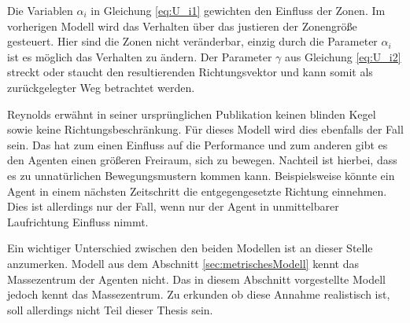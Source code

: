 Die Variablen $\alpha_i$ in Gleichung \ref{eq:U_i1} gewichten den Einfluss der Zonen. Im vorherigen Modell wird das Verhalten über das justieren der Zonengröße gesteuert. Hier sind die Zonen nicht veränderbar, einzig durch die Parameter $\alpha_i$ ist es möglich das Verhalten zu ändern. Der Parameter $\gamma$ aus Gleichung \ref{eq:U_i2} streckt oder staucht den resultierenden Richtungsvektor und kann somit als zurückgelegter Weg betrachtet werden.

Reynolds erwähnt in seiner ursprünglichen Publikation keinen blinden Kegel sowie keine Richtungsbeschränkung. Für dieses Modell wird dies ebenfalls der Fall sein. Das hat zum einen Einfluss auf die Performance und zum anderen gibt es den Agenten einen größeren Freiraum, sich zu bewegen.
Nachteil ist hierbei, dass es zu unnatürlichen Bewegungsmustern kommen kann. Beispielsweise könnte ein Agent in einem nächsten Zeitschritt die entgegengesetzte Richtung einnehmen. Dies ist allerdings nur der Fall, wenn nur der Agent in unmittelbarer Laufrichtung Einfluss nimmt.

Ein wichtiger Unterschied zwischen den beiden Modellen ist an dieser Stelle anzumerken. Modell aus dem Abschnitt \ref{sec:metrischesModell} kennt das Massezentrum der Agenten nicht. Das in diesem Abschnitt vorgestellte Modell jedoch kennt das Massezentrum. Zu erkunden ob diese Annahme realistisch ist, soll allerdings nicht Teil dieser Thesis sein.

